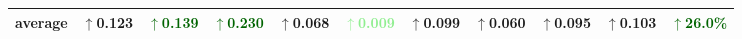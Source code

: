 \begin{table}
{\begin{tabular}{lcccccccccc}
			\midrule
			
			\textbf{average} &\textcolor{medGreen}{$\uparrow$0.123} & \textcolor{darkGreen}{$\uparrow$0.139} & \textcolor{darkGreen}{$\uparrow$0.230} & \textcolor{medGreen}{$\uparrow$0.068} & \textcolor{lightGreen}{$\uparrow$0.009} & \textcolor{medGreen}{$\uparrow$0.099} & \textcolor{medGreen}{$\uparrow$0.060} & \textcolor{medGreen}{$\uparrow$0.095} & \textcolor{medGreen}{$\uparrow$0.103} & \textcolor{darkGreen}{$\uparrow$26.0\%} \\  %
			
			\bottomrule
	\end{tabular}}
	\label{tab:ablation_aug}
\end{table}
